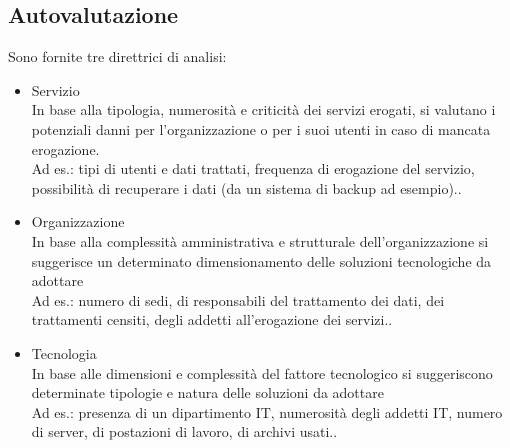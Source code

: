 \subsection{Autovalutazione}
Sono fornite tre direttrici di analisi:
\begin{itemize}
	\item Servizio\\
			In base alla tipologia, numerosit\`a e criticit\`a dei servizi erogati, si valutano i potenziali danni per l'organizzazione o per i suoi utenti in caso di mancata erogazione.\\
			Ad es.: tipi di utenti e dati trattati, frequenza di erogazione del servizio, possibilit\`a di recuperare i dati (da un sistema di backup ad esempio)..
	\item Organizzazione\\
			In base alla complessit\`a amministrativa e strutturale dell'organizzazione si suggerisce un determinato dimensionamento delle soluzioni tecnologiche da adottare\\
			Ad es.: numero di sedi, di responsabili del trattamento dei dati, dei trattamenti censiti, degli addetti all'erogazione dei servizi..
	\item Tecnologia\\
			In base alle dimensioni e complessit\`a del fattore tecnologico si suggeriscono determinate tipologie e natura delle soluzioni da adottare\\
			Ad es.: presenza di un dipartimento IT, numerosit\`a degli addetti IT, numero di server, di postazioni di lavoro, di archivi usati..
\end{itemize}